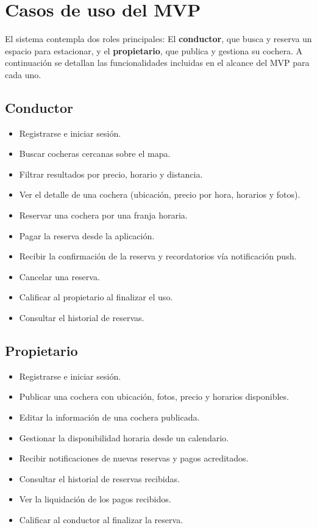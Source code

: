 \section{Casos de uso del MVP}

El sistema contempla dos roles principales: El \textbf{conductor}, que busca y reserva un espacio para estacionar, y el \textbf{propietario}, que publica y gestiona su cochera. A continuación se detallan las funcionalidades incluidas en el alcance del MVP para cada uno.

\subsection{Conductor}

\begin{itemize}
    \item Registrarse e iniciar sesión.
    \item Buscar cocheras cercanas sobre el mapa.
    \item Filtrar resultados por precio, horario y distancia.
    \item Ver el detalle de una cochera (ubicación, precio por hora, horarios y fotos).
    \item Reservar una cochera por una franja horaria.
    \item Pagar la reserva desde la aplicación.
    \item Recibir la confirmación de la reserva y recordatorios vía notificación push.
    \item Cancelar una reserva.
    \item Calificar al propietario al finalizar el uso.
    \item Consultar el historial de reservas.
\end{itemize}

\subsection{Propietario}

\begin{itemize}
    \item Registrarse e iniciar sesión.
    \item Publicar una cochera con ubicación, fotos, precio y horarios disponibles.
    \item Editar la información de una cochera publicada.
    \item Gestionar la disponibilidad horaria desde un calendario.
    \item Recibir notificaciones de nuevas reservas y pagos acreditados.
    \item Consultar el historial de reservas recibidas.
    \item Ver la liquidación de los pagos recibidos.
    \item Calificar al conductor al finalizar la reserva.
\end{itemize}
